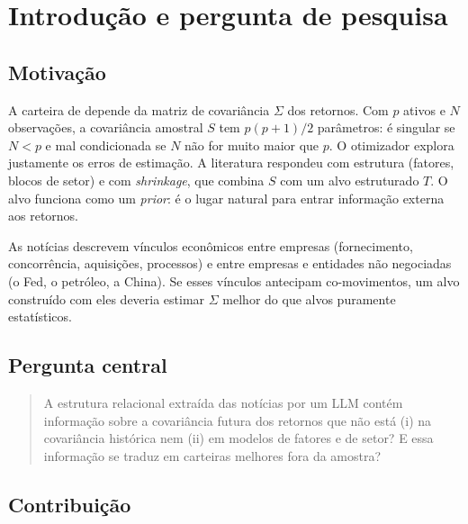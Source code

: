 \documentclass[11pt,a4paper]{article}
\begin{document}
\section{Introdução e pergunta de pesquisa}

\subsection{Motivação}

A carteira de \citet{markowitz1952} depende da matriz de covariância $\Sigma$ dos retornos. Com $p$
ativos e $N$ observações, a covariância amostral $S$ tem $p(p+1)/2$ parâmetros: é singular se $N<p$
e mal condicionada se $N$ não for muito maior que $p$. O otimizador explora justamente os erros de
estimação. A literatura respondeu com estrutura (fatores, blocos de setor) e com \emph{shrinkage},
que combina $S$ com um alvo estruturado $T$. O alvo funciona como um \emph{prior}: é o lugar natural
para entrar informação externa aos retornos.

As notícias descrevem vínculos econômicos entre empresas (fornecimento, concorrência, aquisições,
processos) e entre empresas e entidades não negociadas (o Fed, o petróleo, a China). Se esses
vínculos antecipam co-movimentos, um alvo construído com eles deveria estimar $\Sigma$ melhor do
que alvos puramente estatísticos.

\subsection{Pergunta central}

\begin{quote}
A estrutura relacional extraída das notícias por um LLM contém informação sobre a covariância futura
dos retornos que não está (i) na covariância histórica nem (ii) em modelos de fatores e de setor? E
essa informação se traduz em carteiras melhores fora da amostra?
\end{quote}

\subsection{Contribuição}
\end{document}
